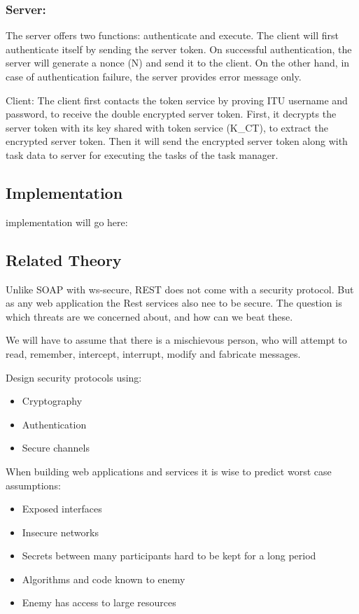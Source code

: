 \subsubsection*{Server:} The server offers two functions: authenticate and execute. The client will first authenticate itself by sending the server token. On successful authentication, the server will generate a nonce (N) and send it to the client. On the other hand, in case of authentication failure, the server provides error message only.
 
Client: The client first contacts the token service by proving ITU username and password, to receive the double encrypted server token. First, it decrypts the server token with its key shared with token service (K_CT), to extract the encrypted server token. Then it will send the encrypted server token along with task data to server for executing  the tasks of the task manager.



\subsection*{Implementation}

implementation will go here:



\subsection*{Related Theory}

Unlike SOAP with ws-secure, REST does not come with a security protocol. But as any web application the 
Rest services also nee to be secure. The question is which threats are we concerned about, and how can we beat these. 

We will have to assume that there is a mischievous person, who will attempt to read, remember, intercept, interrupt, modify and fabricate messages. 

Design security protocols using:
\begin{itemize}
	\item Cryptography
	\item Authentication
	\item Secure channels
\end{itemize}
 
When building web applications and services it is wise to predict worst case assumptions:
\begin{itemize}
	\item Exposed interfaces
	\item Insecure networks
	\item Secrets between many participants hard to be kept for a long period
	\item Algorithms and code known to enemy
	\item Enemy has access to large resources
\end{itemize}

